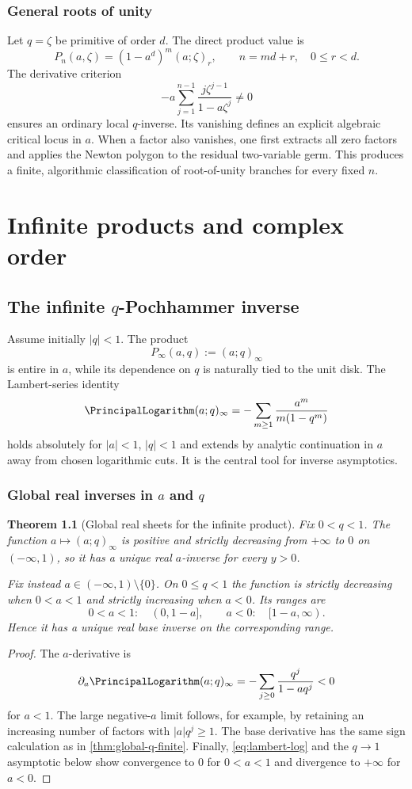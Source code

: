 \documentclass[11pt,oneside]{book}
\newtheorem{theorem}{Theorem}[chapter]
\theoremstyle{definition}
\theoremstyle{remark}
\begin{document}
\section{General roots of unity}
Let $q=\zeta$ be primitive of order $d$.  The direct product value is
\[
 P_n(a,\zeta)=(1-a^d)^m(a;\zeta)_r,
 \qquad n=md+r,\quad 0\le r<d.
\]
The derivative criterion
\[
 -a\sum_{j=1}^{n-1}\frac{j\zeta^{j-1}}{1-a\zeta^j}\ne0
\]
ensures an ordinary local $q$-inverse.  Its vanishing defines an explicit
algebraic critical locus in $a$.  When a factor also vanishes, one first
extracts all zero factors and applies the Newton polygon to the residual
two-variable germ.  This produces a finite, algorithmic classification of
root-of-unity branches for every fixed $n$.

\part{Infinite products and complex order}

\chapter{The infinite $q$-Pochhammer inverse}

Assume initially $|q|<1$.  The product
\[
 P_\infty(a,q):=(a;q)_\infty
\]
is entire in $a$, while its dependence on $q$ is naturally tied to the unit
disk.  The Lambert-series identity
\begin{equation}\label{eq:lambert-log}
 \PrincipalLogarithm(a;q)_\infty
 =-\sum_{m\ge1}\frac{a^m}{m(1-q^m)}
\end{equation}
holds absolutely for $|a|<1$, $|q|<1$ and extends by analytic continuation in
$a$ away from chosen logarithmic cuts.  It is the central tool for inverse
asymptotics.

\section{Global real inverses in $a$ and $q$}
\begin{theorem}[Global real sheets for the infinite product]\label{thm:global-infinite}
Fix $0<q<1$.  The function $a\mapsto(a;q)_\infty$ is positive and strictly
decreasing from $+\infty$ to $0$ on $(-\infty,1)$, so it has a unique real
$a$-inverse for every $y>0$.

Fix instead $a\in(-\infty,1)\setminus\{0\}$.  On $0\le q<1$ the function is
strictly decreasing when $0<a<1$ and strictly increasing when $a<0$.  Its
ranges are
\[
 0<a<1:\quad (0,1-a],
 \qquad
 a<0:\quad [1-a,\infty).
\]
Hence it has a unique real base inverse on the corresponding range.
\end{theorem}
\begin{proof}
The $a$-derivative is
\[
 \partial_a\PrincipalLogarithm(a;q)_\infty
 =-\sum_{j\ge0}\frac{q^j}{1-aq^j}<0
\]
for $a<1$.  The large negative-$a$ limit follows, for example, by retaining an
increasing number of factors with $|a|q^j\ge1$.  The base derivative has the
same sign calculation as in \cref{thm:global-q-finite}.  Finally,
\eqref{eq:lambert-log} and the $q\to1$ asymptotic below show convergence to
$0$ for $0<a<1$ and divergence to $+\infty$ for $a<0$.
\end{proof}
\end{document}
